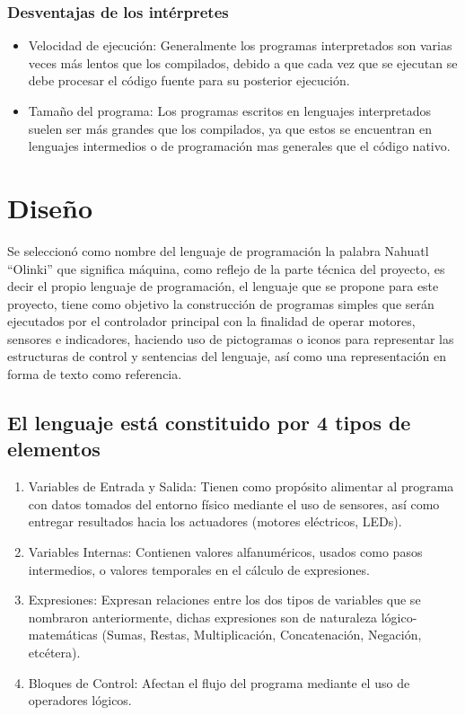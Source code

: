\documentclass[letterpaper,10pt]{article}
\begin{document}
\subsubsection{Desventajas de los intérpretes}

\begin{itemize}
 \item Velocidad de ejecución: Generalmente los programas interpretados
 son varias veces más lentos que los compilados, debido a que cada vez
 que se ejecutan se debe procesar el código fuente para su posterior
 ejecución.
 
 \item Tamaño del programa: Los programas escritos en lenguajes interpretados
 suelen ser más grandes que los compilados, ya que estos se encuentran
 en lenguajes intermedios o de programación mas generales que el código
 nativo.
\end{itemize}

\section{Diseño}

Se seleccionó como nombre del lenguaje de programación la palabra Nahuatl 
``Olinki'' que significa máquina, como reflejo de la parte técnica del proyecto, 
es decir el propio lenguaje de programación, el lenguaje que se propone para este proyecto, tiene como objetivo la construcción de programas simples que 
serán ejecutados por el controlador principal con la finalidad de operar motores, sensores  e indicadores,  
haciendo uso de pictogramas o iconos para representar las estructuras de control y sentencias del lenguaje, así como una representación en forma de  texto como referencia.

\subsection{El lenguaje está constituido por 4 tipos de elementos}


\begin{enumerate}
	\item Variables de Entrada y Salida: Tienen como propósito alimentar al programa con datos tomados del entorno físico mediante el uso de sensores, 
	así como entregar resultados hacia los actuadores (motores eléctricos, LEDs).
	\item	Variables Internas: Contienen valores alfanuméricos, usados como pasos intermedios, o valores temporales en el cálculo de expresiones.
	\item	Expresiones: Expresan relaciones entre los dos tipos de variables que se nombraron anteriormente, dichas expresiones son de naturaleza lógico-matemáticas 
	(Sumas, Restas, Multiplicación, Concatenación, Negación, etcétera).
	\item Bloques de Control: Afectan el flujo del programa mediante el uso de operadores lógicos.
\end{enumerate}
\end{document}
